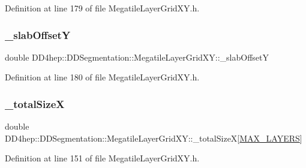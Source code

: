 Definition at line 179 of file Megatile\+Layer\+Grid\+X\+Y.\+h.

\hypertarget{class_d_d4hep_1_1_d_d_segmentation_1_1_megatile_layer_grid_x_y_a61ef3df26e0b23cef4750bcdb597c88f}{}\label{class_d_d4hep_1_1_d_d_segmentation_1_1_megatile_layer_grid_x_y_a61ef3df26e0b23cef4750bcdb597c88f} 
\subsubsection{\texorpdfstring{\+\_\+slab\+OffsetY}{\_slabOffsetY}}
{\footnotesize\ttfamily double D\+D4hep\+::\+D\+D\+Segmentation\+::\+Megatile\+Layer\+Grid\+X\+Y\+::\+\_\+slab\+OffsetY\hspace{0.3cm}{\ttfamily [protected]}}



Definition at line 180 of file Megatile\+Layer\+Grid\+X\+Y.\+h.

\hypertarget{class_d_d4hep_1_1_d_d_segmentation_1_1_megatile_layer_grid_x_y_aa99372ea774b35c1c17cee61d9afbef2}{}\label{class_d_d4hep_1_1_d_d_segmentation_1_1_megatile_layer_grid_x_y_aa99372ea774b35c1c17cee61d9afbef2} 
\subsubsection{\texorpdfstring{\+\_\+total\+SizeX}{\_totalSizeX}}
{\footnotesize\ttfamily double D\+D4hep\+::\+D\+D\+Segmentation\+::\+Megatile\+Layer\+Grid\+X\+Y\+::\+\_\+total\+SizeX\mbox{[}\hyperlink{_megatile_layer_grid_x_y_8h_ade9d4b2ac5f29fe89ffea40e7c58c9d6}{M\+A\+X\+\_\+\+L\+A\+Y\+E\+RS}\mbox{]}\hspace{0.3cm}{\ttfamily [protected]}}



Definition at line 151 of file Megatile\+Layer\+Grid\+X\+Y.\+h.



